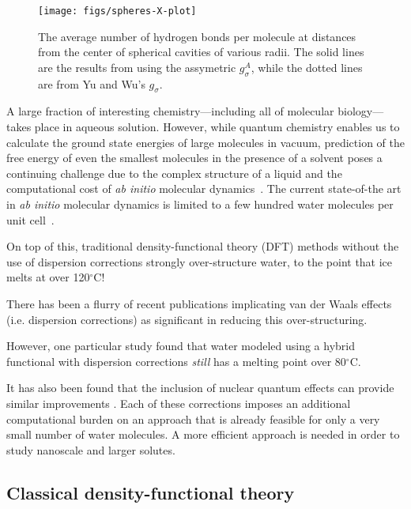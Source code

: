 \documentclass[twocolumn,amsmath,amssymb,prl]{revtex4-1}
\begin{document}
\begin{figure}
\begin{center}
\texttt{[image: figs/spheres-X-plot]}
\end{center}
\caption{ The average number of hydrogen bonds per molecule at
  distances from the center of spherical cavities of various
  radii. The solid lines are the results from using the assymetric
  $g_{\sigma}^A$, while the dotted lines are from Yu and Wu's $g_{\sigma}$.}
\label{fig:spheres-X}
\end{figure}

A large fraction of interesting chemistry---including all of molecular
biology---takes place in aqueous solution.  However, while quantum
chemistry enables us to calculate the ground state energies of large
molecules in vacuum, prediction of the free energy of even the
smallest molecules in the presence of a solvent poses a continuing
challenge due to the complex structure of a liquid and the
computational cost of \emph{ab initio} molecular
dynamics~\cite{car1985, grossman2004}.  The current state-of-the art
in \emph{ab initio} molecular dynamics is limited to a few hundred
water molecules per unit cell~\cite{lewis2011doesnitric}.

On top of this, traditional density-functional theory (DFT) methods
without the use of dispersion corrections strongly over-structure
water, to the point that ice melts at over 120$^\circ$C\cite{yoo2009phase}!

There has been a flurry of recent
publications implicating van der Waals effects (i.e. dispersion
corrections) as significant in
reducing this over-structuring\cite{lin2009importance,
  wang2011density, mogelhoj2011ab, jonchiere2011van}.

However, one particular study found that water modeled using a
hybrid functional with dispersion corrections \emph{still} has a
melting point over 80$^\circ$C\cite{yoo2011}.

It has also
been found that the inclusion of nuclear quantum effects can provide
similar improvements \cite{morrone2008nuclear}.  Each of these
corrections imposes an additional computational burden on an approach
that is already feasible for only a very small number of water
molecules. A more efficient approach is needed in order to study
nanoscale and larger solutes.

\subsection{Classical density-functional theory}
\end{document}
